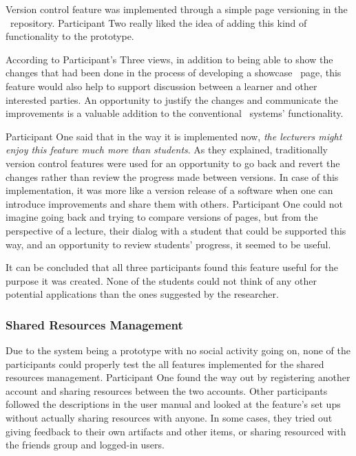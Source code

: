 Version control feature was implemented through a simple page versioning in the
\ep~repository. Participant Two really liked the idea of adding this kind of
functionality to the prototype.


According to Participant's Three views, in addition to being able to show the
changes that had been done in the process of developing a showcase \ep~page,
this feature would also help to support discussion between a learner and other
interested parties. An opportunity to justify the changes and communicate the
improvements is a valuable addition to the conventional \ep~systems'
functionality.


Participant One said that in the way it is implemented now, \textit{the
lecturers might enjoy this feature much more than students}. As they explained,
traditionally version control features were used for an opportunity to go
back and revert the changes rather than review the progress made between
versions. In case of this implementation, it was more like a version release of
a software when one can introduce improvements and share them with others.
Participant One could not imagine going back and trying to compare versions of
pages, but from the perspective of a lecture, their dialog with a student
that could be supported this way, and an opportunity to review students'
progress, it seemed to be useful.

It can be concluded that all three participants found this feature useful for
the purpose it was created. None of the students could not think of any other
potential applications than the ones suggested by the researcher.

\subsubsection{Shared Resources Management}

Due to the system being a prototype with no social activity going on, none of
the participants could properly test the all features implemented for the shared
resources management. Participant One found the way out by registering another
account and sharing resources between the two accounts. Other participants
followed the descriptions in the user manual and looked at the feature's set ups
without actually sharing resources with anyone. In some cases, they tried out
giving feedback to their own artifacts and other items, or sharing resourced
with the friends group and logged-in users.

